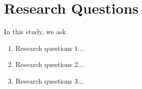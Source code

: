 \section{Research Questions}

In this study, we ask 

\begin{enumerate}
    \item Research questions 1...
    \item Research questions 2...
    \item Research questions 3...
\end{enumerate}
